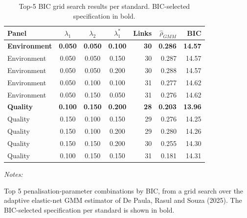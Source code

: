 \begin{table}[!h]
\centering
\caption{\label{tab:tab:grid_search}Top-5 BIC grid search results per standard. BIC-selected specification in bold.}
\centering
\fontsize{9}{11}\selectfont
\begin{threeparttable}
\begin{tabular}[t]{lcccrrr}
\toprule
Panel & $\lambda_1$ & $\lambda_2$ & $\lambda_1^*$ & Links & $\hat\rho_{GMM}$ & BIC\\
\midrule
\textbf{Environment} & \textbf{0.050} & \textbf{0.050} & \textbf{0.100} & \textbf{30} & \textbf{0.286} & \textbf{14.57}\\
Environment & 0.050 & 0.050 & 0.150 & 30 & 0.287 & 14.57\\
Environment & 0.050 & 0.050 & 0.200 & 30 & 0.288 & 14.57\\
Environment & 0.050 & 0.100 & 0.100 & 31 & 0.277 & 14.62\\
Environment & 0.050 & 0.150 & 0.050 & 31 & 0.276 & 14.62\\
\addlinespace
\textbf{Quality} & \textbf{0.100} & \textbf{0.150} & \textbf{0.200} & \textbf{28} & \textbf{0.203} & \textbf{13.96}\\
Quality & 0.150 & 0.100 & 0.150 & 29 & 0.276 & 14.25\\
Quality & 0.150 & 0.100 & 0.200 & 29 & 0.280 & 14.26\\
Quality & 0.150 & 0.150 & 0.200 & 30 & 0.255 & 14.30\\
Quality & 0.100 & 0.150 & 0.150 & 31 & 0.181 & 14.31\\
\bottomrule
\end{tabular}
\begin{tablenotes}[para]
\item \textit{Notes:} 
\item Top 5 penalisation-parameter combinations by BIC, from a grid search over the adaptive elastic-net GMM estimator of De Paula, Rasul and Souza (2025). The BIC-selected specification per standard is shown in bold.
\end{tablenotes}
\end{threeparttable}
\end{table}
